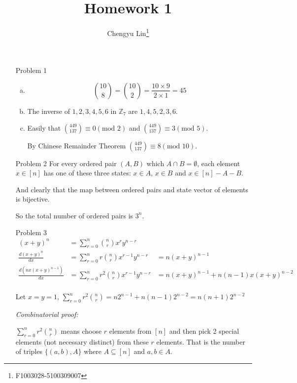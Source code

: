 \documentclass{article}
\title{Homework 1}
\author{Chengyu Lin\footnote{F1003028-5100309007}}
\date{}
\begin{document}
\maketitle

\begin{itemize}
    \item[Problem 1]
        \begin{enumerate}[(a)]
            \item
                $${10\choose8} = {10\choose2} = \frac{10 \times 9}{2 \times 1} = 45$$
            \item
                The inverse of $1, 2, 3, 4, 5, 6$ in $\mathbb{Z}_7$ are
                $1, 4, 5, 2, 3, 6$.
            \item
                Easily that ${449 \choose 137} \equiv 0 (\text{mod }2)$ and
                ${449 \choose 137} \equiv 3 (\text{mod } 5)$.

                By Chinese Remainder Theorem ${449 \choose 137} \equiv 8 (\text{mod } 10)$.
        \end{enumerate}
    \item[Problem 2]
        For every ordered pair $(A, B)$ which $A \cap B = \emptyset$, 
        each element $x \in [n]$ has one of these
        three states: $x \in A$, $x \in B$ and $x \in [n] - A - B$.

        And clearly that the map between ordered pairs and state vector
        of elements is bijective.

        So the total number of ordered pairs is $3^n$.

    \item[Problem 3]
        \begin{align*}
            (x + y)^n &= \sum_{r=0}^{n} {n \choose r}x^r y^{n-r} \\
            \frac{d(x + y)^n}{dx} &= \sum_{r=0}^{n} r {n \choose r}x^{r-1} y^{n-r} &= n(x + y)^{n-1} \\
            \frac{d(nx(x+y)^{n-1})}{dx} &= \sum_{r=0}^{n} r^2 {n \choose r} x^{r-1} y^{n-r} &= n(x+y)^{n-1} + n(n-1)x(x + y)^{n-2} \\
        \end{align*}

        Let $x = y = 1$, $\sum_{r=0}^{n} r^2 {n \choose r} = n2^{n-1} + n(n-1)2^{n-2} = n(n + 1)2^{n-2}$

        \textit{Combinatorial proof: }

        $\sum_{r=0}^{n}r^2 {n \choose r}$ means choose $r$ elements from $[n]$ and then
        pick 2 special elements (not necessary distinct) from these $r$ elements. That is
        the number of triples $\{(a, b), A\}$ where $A \subseteq [n]$ and $a, b \in A$.


\end{itemize}
\end{document}
